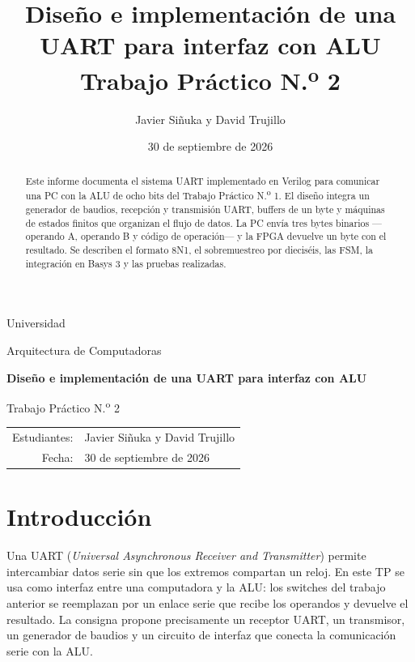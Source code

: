 \documentclass[11pt,a4paper]{article}
\title{\textbf{Diseño e implementación de una UART para interfaz con ALU}\\[0.4em]\large Trabajo Práctico N.\textsuperscript{o} 2}
\author{Javier Siñuka y David Trujillo}
\date{30 de septiembre de 2026}
\begin{document}
\begin{titlepage}
  \hypersetup{pageanchor=false}
  \centering
  \vspace*{1.2cm}
  {\Large Universidad \par}
  \vspace{0.3cm}
  {\large Arquitectura de Computadoras \par}
  \vspace{2.2cm}
  {\LARGE\bfseries Diseño e implementación de una UART para interfaz con ALU\par}
  \vspace{0.5cm}
  {\large Trabajo Práctico N.\textsuperscript{o} 2\par}
  \vfill
  \begin{tabular}{rl}
    Estudiantes: & Javier Siñuka y David Trujillo \\
    Fecha: & 30 de septiembre de 2026
  \end{tabular}
  \vfill
\end{titlepage}

\hypersetup{pageanchor=true}
\clearpage
{}
\tableofcontents
\clearpage
{}

\begin{abstract}
Este informe documenta el sistema UART implementado en Verilog para comunicar una PC con la ALU de ocho bits del Trabajo Práctico N.\textsuperscript{o} 1. El diseño integra un generador de baudios, recepción y transmisión UART, buffers de un byte y máquinas de estados finitos que organizan el flujo de datos. La PC envía tres bytes binarios ---operando A, operando B y código de operación--- y la FPGA devuelve un byte con el resultado. Se describen el formato 8N1, el sobremuestreo por dieciséis, las FSM, la integración en Basys 3 y las pruebas realizadas.
\end{abstract}

\section{Introducción}

Una UART (\textit{Universal Asynchronous Receiver and Transmitter}) permite intercambiar datos serie sin que los extremos compartan un reloj. En este TP se usa como interfaz entre una computadora y la ALU: los switches del trabajo anterior se reemplazan por un enlace serie que recibe los operandos y devuelve el resultado. La consigna propone precisamente un receptor UART, un transmisor, un generador de baudios y un circuito de interfaz que conecta la comunicación serie con la ALU.
\end{document}
